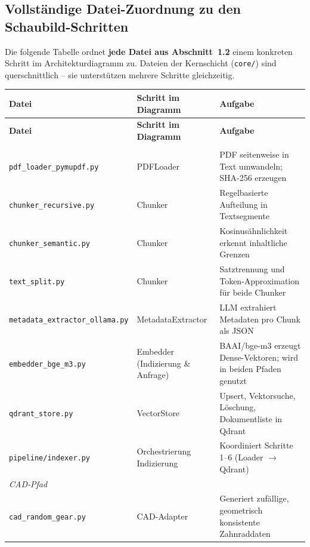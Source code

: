 \documentclass[12pt, a4paper]{article}
\begin{document}
\subsection{Vollständige Datei-Zuordnung zu den Schaubild-Schritten}

Die folgende Tabelle ordnet \textbf{jede Datei aus Abschnitt~1.2} einem konkreten Schritt
im Architekturdiagramm zu. Dateien der Kernschicht (\texttt{core/}) sind querschnittlich --
sie unterstützen mehrere Schritte gleichzeitig.

\begin{longtable}{p{5.2cm} p{3.5cm} p{5.5cm}}
\toprule
\textbf{Datei} & \textbf{Schritt im Diagramm} & \textbf{Aufgabe} \\
\midrule
\endfirsthead
\toprule
\textbf{Datei} & \textbf{Schritt im Diagramm} & \textbf{Aufgabe} \\
\midrule
\endhead
\bottomrule
\endfoot

\multicolumn{3}{l}{\textit{\small Indizierungspfad}} \\[2pt]
\texttt{pdf\_loader\_pymupdf.py}     & PDFLoader            & PDF seitenweise in Text umwandeln; SHA-256 erzeugen \\[3pt]
\texttt{chunker\_recursive.py}       & Chunker              & Regelbasierte Aufteilung in Textsegmente \\[3pt]
\texttt{chunker\_semantic.py}        & Chunker              & Kosinusähnlichkeit erkennt inhaltliche Grenzen \\[3pt]
\texttt{text\_split.py}              & Chunker              & Satztrennung und Token-Approximation für beide Chunker \\[3pt]
\texttt{metadata\_extractor\_ollama.py} & MetadataExtractor & LLM extrahiert Metadaten pro Chunk als JSON \\[3pt]
\texttt{embedder\_bge\_m3.py}        & Embedder (Indizierung \& Anfrage) & BAAI/bge-m3 erzeugt Dense-Vektoren; wird in beiden Pfaden genutzt \\[3pt]
\texttt{qdrant\_store.py}            & VectorStore          & Upsert, Vektorsuche, Löschung, Dokumentliste in Qdrant \\[3pt]
\texttt{pipeline/indexer.py}         & Orchestrierung Indizierung & Koordiniert Schritte 1--6 (Loader $\to$ Qdrant) \\[6pt]

\multicolumn{3}{l}{\textit{\small CAD-Pfad}} \\[2pt]
\texttt{cad\_random\_gear.py}        & CAD-Adapter          & Generiert zufällige, geometrisch konsistente Zahnraddaten \\[6pt]


\end{longtable}
\end{document}
